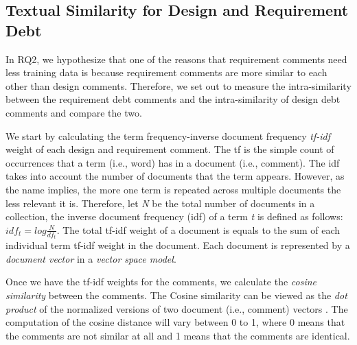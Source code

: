 


\subsection{Textual Similarity for Design and Requirement Debt}


In RQ2, we hypothesize that one of the reasons that requirement \SATD comments need less training data is because requirement \SATD comments are more similar to each other than design \SATD comments. Therefore, we set out to measure the intra-similarity between the requirement debt comments and the intra-similarity of design debt comments and compare the two.


We start by calculating the term frequency-inverse document frequency \textit{tf-idf} weight of each design and requirement \SATD comment. The tf is the simple count of occurrences that a term (i.e., word) has in a document (i.e., comment). The idf takes into account the number of documents that the term appears. However, as the name implies, the more one term is repeated across multiple documents the less relevant it is. Therefore, let \textit{N} be the total number of documents in a collection, the inverse document frequency (idf) of a term \textit{t} is defined as follows: \(idf_{t} = log\frac{N}{df_{t}}\). The total tf-idf weight of a document is equals to the sum of each individual term tf-idf weight in the document. Each document is represented by a \textit{document vector} in a \textit{vector space model}. 

Once we have the tf-idf weights for the comments, we calculate the \textit{cosine similarity} between the comments. The Cosine similarity can be viewed as the \textit{dot product} of the normalized versions of two document (i.e., comment) vectors \cite{Manning2008book}. The computation of the cosine distance will vary between 0 to 1, where 0 means that the comments are not similar at all and 1 means that the comments are identical.

